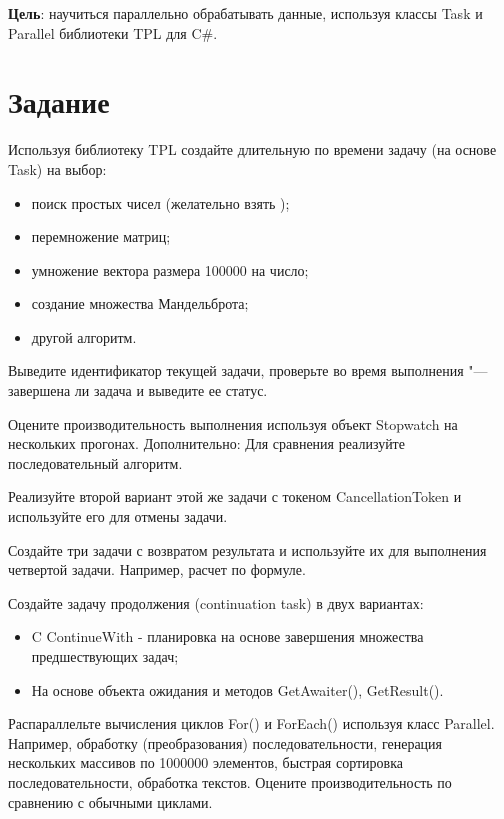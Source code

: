 \documentclass{bsuir}
\newcommand{\csharp}{C{\liberationrm\#}}
\begin{document}
\maketitle
\mainmatter
\renewcommand{\thefigure}{\arabic{figure}}
\renewcommand{\thelisting}{\arabic{listing}}

\textbf{Цель}: научиться параллельно обрабатывать данные, используя классы Task
и Parallel библиотеки TPL для \csharp.

\section*{Задание}

Используя библиотеку TPL создайте длительную по времени задачу (на основе Task)
на выбор:

\begin{itemize}
  \item поиск простых чисел (желательно взять );
  \item перемножение матриц;
  \item умножение вектора размера 100000 на число;
  \item создание множества Мандельброта;
  \item другой алгоритм.
\end{itemize}

Выведите идентификатор текущей задачи, проверьте во время выполнения "---
завершена ли задача и выведите ее статус.

Оцените производительность выполнения используя объект Stopwatch на нескольких
прогонах. Дополнительно: Для сравнения реализуйте последовательный алгоритм.

Реализуйте второй вариант этой же задачи с токеном CancellationToken и
используйте его для отмены задачи.

Создайте три задачи с возвратом результата и используйте их для выполнения
четвертой задачи. Например, расчет по формуле.

Создайте задачу продолжения (continuation task) в двух вариантах:

\begin{itemize}
  \item C ContinueWith - планировка на основе завершения множества предшествующих
        задач;
  \item На основе объекта ожидания и методов GetAwaiter(), GetResult().
\end{itemize}

Распараллельте вычисления циклов For() и ForEach() используя класс Parallel.
Например, обработку (преобразования) последовательности, генерация нескольких
массивов по 1000000 элементов, быстрая сортировка последовательности, обработка
текстов. Оцените производительность по сравнению с обычными циклами.
\end{document}
